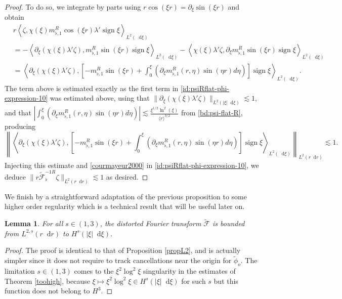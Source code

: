 \documentclass[11 pt]{amsart}
\newtheorem{lem}{Lemma}[section]
\theoremstyle{definition}
\theoremstyle{remark}
\numberwithin{equation}{section}
\newcommand{\dd}{\mathop{}\!\mathrm{d}}
\begin{document}
\begin{proof}
To do so, we integrate by parts using $r\cos(\xi r)=\partial_\xi \sin (\xi r)$ and obtain
\begin{align*}
& r \left\langle \zeta,  \chi(\xi) m_{\flat, 1}^R \cos (\xi r) \lambda' \operatorname{sign} \xi\right\rangle_{L^2(\dd \xi)} \\
& = - \left\langle \partial_\xi( \chi(\xi) \lambda' \zeta), m_{\flat, 1}^R \sin (\xi r)\operatorname{sign} \xi\right\rangle_{L^2(\dd \xi)}- \left\langle \chi(\xi)\lambda'  \zeta,  \partial_\xi m_{\flat, 1}^R \sin (\xi r) \operatorname{sign} \xi\right\rangle_{L^2(\dd \xi)} \\
& = \left\langle \partial_\xi( \chi(\xi) \lambda' \zeta), [- m_{\flat, 1}^R \sin (\xi r) + \int_0^\xi (\partial_\xi m_{\flat, 1}^R(r, \eta) \sin (\eta r)d\eta)]\operatorname{sign} \xi\right\rangle_{L^2(\dd \xi)}.
\end{align*}
The term above is estimated exactly as the first term in \eqref{id:psiRflat-phi-expression-10} was estimated above, using that $\|\partial_\xi( \chi(\xi) \lambda' \zeta)\|_{L^2(|\xi|\dd\xi)}\lesssim 1$, and that $| \int_0^\xi (\partial_\xi m_{\flat, 1}^R(r, \eta) \sin (\eta r)d\eta)|\lesssim \frac{\xi^{1/2} \ln^2 (\xi)}{\langle r \rangle^{3 / 2}}$ from \eqref{bd:psi-flat-R}, producing
$$
\left\|\left\langle \partial_\xi( \chi(\xi) \lambda' \zeta), [- m_{\flat, 1}^R \sin (\xi r) + \int_0^\xi (\partial_\xi m_{\flat, 1}^R(r, \eta) \sin (\eta r)d\eta)]\operatorname{sign} \xi\right\rangle_{L^2(\dd \xi)}\right\|_{L^2(r\dd r)}\lesssim 1.
$$
Injecting this estimate and \eqref{courmayeur2000} in \eqref{id:psiRflat-phi-expression-10}, we deduce $\| r \widetilde{\mathcal{F}}^{-1R}_\flat \zeta \|_{L^2(r\dd r)}\lesssim 1$ as desired.
\end{proof}



We finish by a straightforward adaptation of the previous proposition to some higher order regularity which is a technical result that will be useful later on.



\begin{lem} \label{lem:continuity-distorted-Fourier-L2s-Hs}
For all $s\in (1,3)$, the distorted Fourier transform $\widetilde{\mathcal F}$ is bounded from $L^{2,s}(r\dd r)$ to $H^{s}(|\xi|\dd \xi)$.
\end{lem}



\begin{proof}
The proof is identical to that of Proposition \ref{propL2}, and is actually simpler since it does not require to track cancellations near the origin for $\widetilde{\phi}_o$. The limitation $s\in (1,3)$ comes to the $\xi^2\log^2 \xi$ singularity in the estimates of Theorem \ref{toohigh}, because $\xi \mapsto \xi^2\log^2 \xi \in H^{s}(|\xi|\dd \xi)$ for such $s$ but this function does not belong to $H^3$.
\end{proof}
\end{document}
